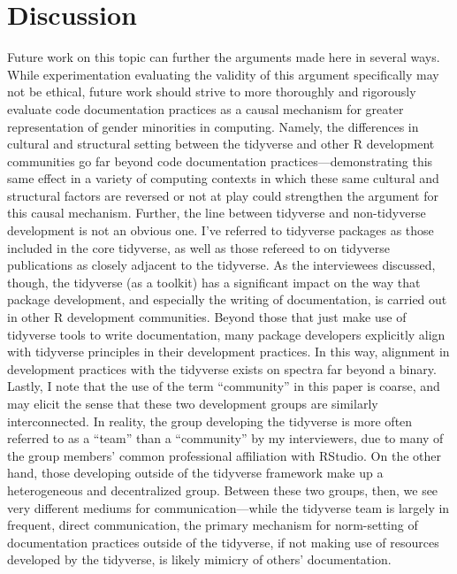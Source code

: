 \section{Discussion}\label{sec:disc}

Future work on this topic can further the arguments made here in several ways. While experimentation evaluating the validity of this argument specifically may not be ethical, future work should strive to more thoroughly and rigorously evaluate code documentation practices as a causal mechanism for greater representation of gender minorities in computing. Namely, the differences in cultural and structural setting between the tidyverse and other R development communities go far beyond code documentation practices---demonstrating this same effect in a variety of computing contexts in which these same cultural and structural factors are reversed or not at play could strengthen the argument for this causal mechanism. Further, the line between tidyverse and non-tidyverse development is not an obvious one. I've referred to tidyverse packages as those included in the core tidyverse, as well as those refereed to on tidyverse publications as closely adjacent to the tidyverse. As the interviewees discussed, though, the tidyverse (as a toolkit) has a significant impact on the way that package development, and especially the writing of documentation, is carried out in other R development communities. Beyond those that just make use of tidyverse tools to write documentation, many package developers explicitly align with tidyverse principles in their development practices. In this way, alignment in development practices with the tidyverse exists on spectra far beyond a binary. Lastly, I note that the use of the term ``community'' in this paper is coarse, and may elicit the sense that these two development groups are similarly interconnected. In reality, the group developing the tidyverse is more often referred to as a ``team'' than a ``community'' by my interviewers, due to many of the group members' common professional affiliation with RStudio. On the other hand, those developing outside of the tidyverse framework make up a heterogeneous and decentralized group. Between these two groups, then, we see very different mediums for communication---while the tidyverse team is largely in frequent, direct communication, the primary mechanism for norm-setting of documentation practices outside of the tidyverse, if not making use of resources developed by the tidyverse, is likely mimicry of others' documentation.

